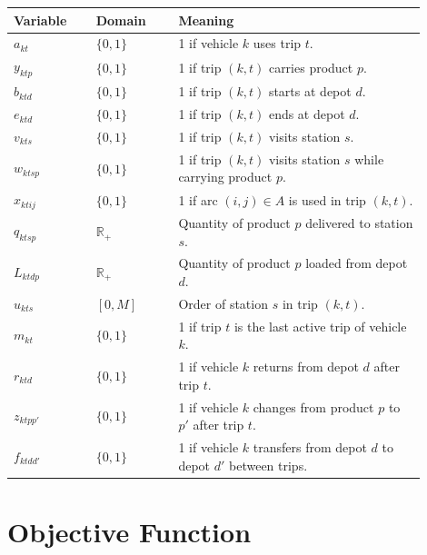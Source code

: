 \documentclass[11pt,a4paper]{article}
\begin{document}
\begin{table}[h]
\centering
\begin{tabular}{p{0.18\linewidth}p{0.18\linewidth}p{0.54\linewidth}}
\toprule
Variable & Domain & Meaning \\
\midrule
\(a_{kt}\) & \(\{0,1\}\) & 1 if vehicle \(k\) uses trip \(t\). \\
\(y_{ktp}\) & \(\{0,1\}\) & 1 if trip \((k,t)\) carries product \(p\). \\
\(b_{ktd}\) & \(\{0,1\}\) & 1 if trip \((k,t)\) starts at depot \(d\). \\
\(e_{ktd}\) & \(\{0,1\}\) & 1 if trip \((k,t)\) ends at depot \(d\). \\
\(v_{kts}\) & \(\{0,1\}\) & 1 if trip \((k,t)\) visits station \(s\). \\
\(w_{ktsp}\) & \(\{0,1\}\) & 1 if trip \((k,t)\) visits station \(s\) while carrying product \(p\). \\
\(x_{ktij}\) & \(\{0,1\}\) & 1 if arc \((i,j)\in A\) is used in trip \((k,t)\). \\
\(q_{ktsp}\) & \(\mathbb{R}_+\) & Quantity of product \(p\) delivered to station \(s\). \\
\(L_{ktdp}\) & \(\mathbb{R}_+\) & Quantity of product \(p\) loaded from depot \(d\). \\
\(u_{kts}\) & \([0,M]\) & Order of station \(s\) in trip \((k,t)\). \\
\(m_{kt}\) & \(\{0,1\}\) & 1 if trip \(t\) is the last active trip of vehicle \(k\). \\
\(r_{ktd}\) & \(\{0,1\}\) & 1 if vehicle \(k\) returns from depot \(d\) after trip \(t\). \\
\(z_{ktpp'}\) & \(\{0,1\}\) & 1 if vehicle \(k\) changes from product \(p\) to \(p'\) after trip \(t\). \\
\(f_{ktdd'}\) & \(\{0,1\}\) & 1 if vehicle \(k\) transfers from depot \(d\) to depot \(d'\) between trips. \\
\bottomrule
\end{tabular}
\end{table}

\section{Objective Function}
\end{document}
